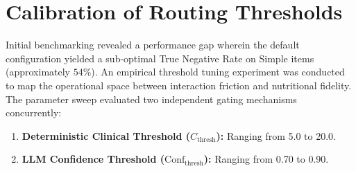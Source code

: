 \section{Calibration of Routing Thresholds}
\label{sec:threshold-calibration}

Initial benchmarking revealed a performance gap wherein the default configuration yielded a sub-optimal True Negative Rate on Simple items (approximately $54\%$). An empirical threshold tuning experiment was conducted to map the operational space between interaction friction and nutritional fidelity. The parameter sweep evaluated two independent gating mechanisms concurrently:

\begin{enumerate}
    \item \textbf{Deterministic Clinical Threshold ($C_{\text{thresh}}$):} Ranging from 5.0 to 20.0.
    \item \textbf{LLM Confidence Threshold ($\text{Conf}_{\text{thresh}}$):} Ranging from 0.70 to 0.90.
\end{enumerate}

